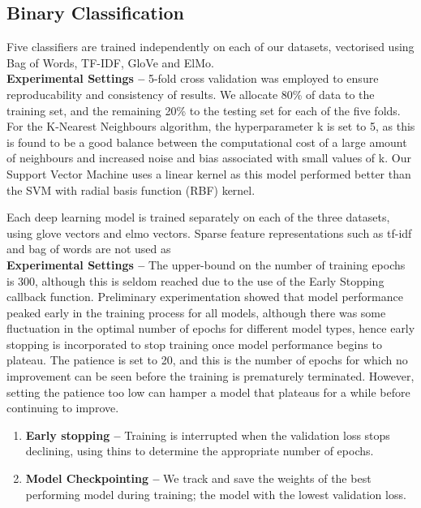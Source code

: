 \documentclass[12pt,a4paper]{article}
\begin{document}
\subsection{Binary Classification}
\noindent Five classifiers are trained independently on each of our datasets, vectorised using Bag of Words, TF-IDF, GloVe and ElMo.\\ %


\noindent \textbf{Experimental Settings --} 5-fold cross validation was employed to ensure reproducability and consistency of results. We allocate 80\% of data to the training set, and the remaining 20\% to the testing set for each of the five folds. For the K-Nearest Neighbours algorithm, the hyperparameter k is set to 5, as this is found to be a good balance between the computational cost of a large amount of neighbours and increased noise and bias associated with small values of k. Our Support Vector Machine uses a linear kernel as this model performed better than the SVM with radial basis function (RBF) kernel.

\noindent Each deep learning model is trained separately on each of the three datasets, using glove vectors and elmo vectors. Sparse feature representations such as tf-idf and bag of words are not used as\\



\noindent \textbf{Experimental Settings --} The upper-bound on the number of training epochs is 300, although this is seldom reached due to the use of the Early Stopping callback function. Preliminary experimentation showed that model performance peaked early in the training process for all models, although there was some fluctuation in the optimal number of epochs for different model types, hence early stopping is incorporated to stop training once model performance begins to plateau. The patience is set to 20, and this is the number of epochs for which no improvement can be seen before the training is prematurely terminated. However, setting the patience too low can hamper a model that plateaus for a while before continuing to improve.

\begin{enumerate}
	\item \textbf{Early stopping --} Training is interrupted when the validation loss stops declining, using thins to determine the appropriate number of epochs.
	\item \textbf{Model Checkpointing --} We track and save the weights of the best performing model during training; the model with the lowest validation loss.
\end{enumerate}
\end{document}
